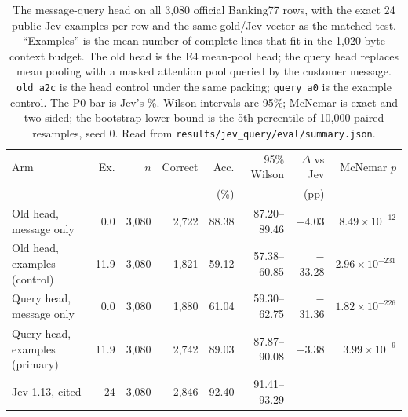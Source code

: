 \begin{table}[htbp]
\centering
\footnotesize
\caption{The message-query head on all 3{,}080 official Banking77 rows, with
the exact 24 public Jev examples per row and the same gold/Jev vector as the
matched test. ``Examples'' is the mean number of complete lines that fit in the
1{,}020-byte context budget. The old head is the E4 mean-pool head; the query
head replaces mean pooling with a masked attention pool queried by the customer
message. \texttt{old\_a2c} is the head control under the same packing;
\texttt{query\_a0} is the example control. The P0 bar is Jev's \QueryJevPct\%.
Wilson intervals are 95\%;
McNemar is exact and two-sided; the bootstrap lower bound is the 5th percentile
of 10{,}000 paired resamples, seed 0. Read from
\texttt{results/jev\_query/eval/summary.json}.}
\label{tab:query-head}
\setlength{\tabcolsep}{2pt}
\begin{tabular}{@{}lrrrrrrr@{}}
\toprule
Arm & Ex. & $n$ & Correct & Acc. & 95\% Wilson & $\Delta$ vs Jev & McNemar $p$ \\
 & & & & (\%) & & (pp) & \\
\midrule
Old head, message only & 0.0 & 3{,}080 & 2{,}722 & 88.38 & 87.20--89.46 & $-$4.03 & $8.49\times10^{-12}$ \\
Old head, examples (control) & 11.9 & 3{,}080 & 1{,}821 & 59.12 & 57.38--60.85 & $-$33.28 & $2.96\times10^{-231}$ \\
Query head, message only & 0.0 & 3{,}080 & 1{,}880 & 61.04 & 59.30--62.75 & $-$31.36 & $1.82\times10^{-226}$ \\
Query head, examples (primary) & 11.9 & 3{,}080 & 2{,}742 & 89.03 & 87.87--90.08 & $-$3.38 & $3.99\times10^{-9}$ \\
Jev 1.13, cited & 24 & 3{,}080 & 2{,}846 & 92.40 & 91.41--93.29 & --- & --- \\
\bottomrule
\end{tabular}
\end{table}

